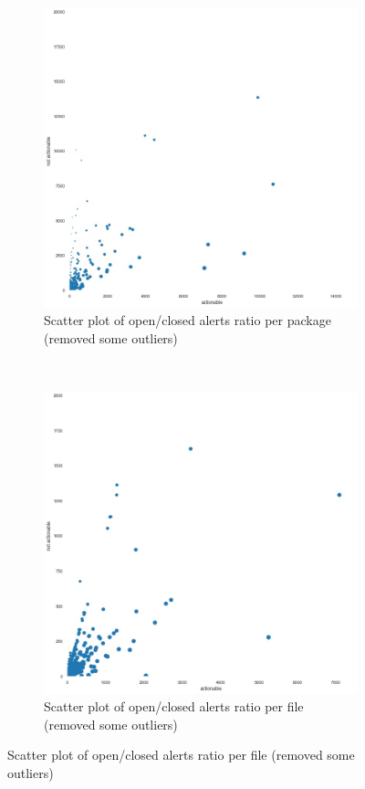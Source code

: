 \begin{figure}[H]
	\begin{subfigure}{\textwidth}
		\centering
		\includegraphics[scale=0.4]{./src/data_analysis/packages_ratio_scatter.jpg}
		\caption{Scatter plot of open/closed alerts ratio per package (removed some outliers)}\label{}
	\end{subfigure}\\
	\begin{subfigure}{\textwidth}
		\centering
		\includegraphics[scale=0.4]{./src/data_analysis/files_ratio_scatter.jpg}
		\caption{Scatter plot of open/closed alerts ratio per file (removed some outliers)}\label{}
	\end{subfigure}%
\end{figure}



